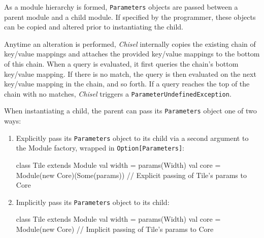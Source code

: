 \documentclass[10pt,twocolumn]{article}
\def\code#1{{\small\tt #1}}
\begin{document}
As a module hierarchy is formed, \code{Parameters} objects are passed between a parent module and a child module. If specified by the programmer, these objects can be copied and altered prior to instantiating the child.

Anytime an alteration is performed, {\em Chisel} internally copies the existing chain of key/value mappings and attaches the provided key/value mappings to the bottom of this chain. When a query is evaluated, it first queries the chain's bottom key/value mapping. If there is no match, the query is then evaluated on the next key/value mapping in the chain, and so forth. If a query reaches the top of the chain with no matches, {\em Chisel} triggers a \code{ParameterUndefinedException}.

When instantiating a child, the parent can pass its \code{Parameters} object one of two ways:
\begin{enumerate}
  \item Explicitly pass its \code{Parameters} object to its child via a second argument to the Module factory, wrapped in \code{Option[Parameters]}:
\begin{scala}
class Tile extends Module { 
  val width = params(Width) 
  val core = Module(new Core)(Some(params))
  // Explicit passing of Tile's params to Core
}
\end{scala}
  \item Implicitly pass its \code{Parameters} object to its child:
\begin{scala}
class Tile extends Module { 
  val width = params(Width)
  val core = Module(new Core)
  // Implicit passing of Tile's params to Core
}
\end{scala}
\end{enumerate}
\end{document}
